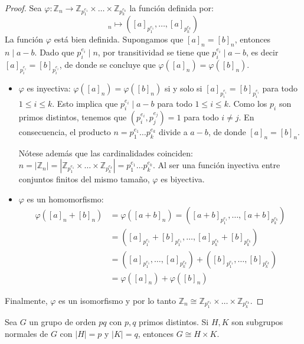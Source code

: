 \begin{proof}
    Sea $\varphi: \mathbb{Z}_n \to \mathbb{Z}_{p_1^{e_1}} \times \dots \times \mathbb{Z}_{p_k^{e_k}}$ la función definida por:
    \begin{equation*}
        [a]_n \mapsto ([a]_{p_1^{e_1}}, \dots, [a]_{p_k^{e_k}})
    \end{equation*}
    La función $\varphi$ está bien definida. Supongamos que $[a]_n = [b]_n$, entonces $n \mid a-b$. Dado que $p_i^{e_i} \mid n$, por transitividad se tiene que $p_i^{e_i} \mid a-b$, es decir $[a]_{p_i^{e_i}} = [b]_{p_i^{e_i}}$, de donde se concluye que $\varphi([a]_n) = \varphi([b]_n)$.

    \begin{itemize}
        \item $\varphi$ es inyectiva:
        $\varphi([a]_n) = \varphi([b]_n)$ si y solo si $[a]_{p_i^{e_i}} = [b]_{p_i^{e_i}}$ para todo $1 \leq i \leq k$. Esto implica que $p_i^{e_i} \mid a-b$ para todo $1 \leq i \leq k$. Como los $p_i$ son primos distintos, tenemos que $(p_i^{e_i}, p_j^{e_j}) = 1$ para todo $i \neq j$. En consecuencia, el producto $n = p_1^{e_1} \dots p_k^{e_k}$ divide a $a-b$, de donde $[a]_n = [b]_n$.
        
        Nótese además que las cardinalidades coinciden: $n = |\mathbb{Z}_n| = |\mathbb{Z}_{p_1^{e_1}} \times \dots \times \mathbb{Z}_{p_k^{e_k}}| = p_1^{e_1} \dots p_k^{e_k}$. Al ser una función inyectiva entre conjuntos finitos del mismo tamaño, $\varphi$ es biyectiva.

        \item $\varphi$ es un homomorfismo:
        \begin{align*}
            \varphi([a]_n + [b]_n) &= \varphi([a+b]_n) = ([a+b]_{p_1^{e_1}}, \dots, [a+b]_{p_k^{e_k}}) \\
            &= ([a]_{p_1^{e_1}} + [b]_{p_1^{e_1}}, \dots, [a]_{p_k^{e_k}} + [b]_{p_k^{e_k}}) \\
            &= ([a]_{p_1^{e_1}}, \dots, [a]_{p_k^{e_k}}) + ([b]_{p_1^{e_1}}, \dots, [b]_{p_k^{e_k}}) \\
            &= \varphi([a]_n) + \varphi([b]_n)
        \end{align*}
    \end{itemize}
    Finalmente, $\varphi$ es un isomorfismo y por lo tanto $\mathbb{Z}_n \cong \mathbb{Z}_{p_1^{e_1}} \times \dots \times \mathbb{Z}_{p_k^{e_k}}$.
\end{proof}

\begin{eje}
    Sea $G$ un grupo de orden $pq$ con $p, q$ primos distintos. Si $H, K$ son subgrupos normales de $G$ con $|H|=p$ y $|K|=q$, entonces $G \cong H \times K$.
\end{eje}

